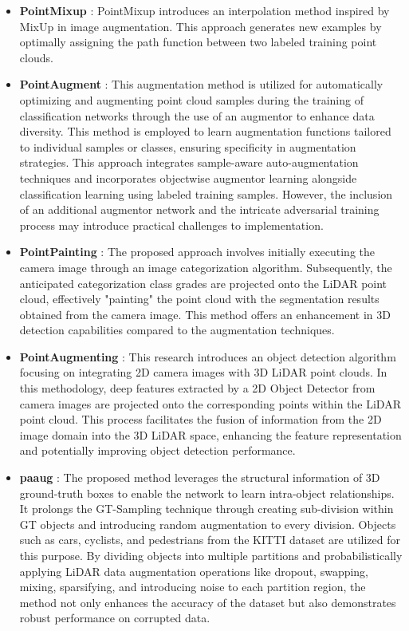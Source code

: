 \begin{itemize}
    \item \textbf{PointMixup} : PointMixup \parencite{pointmixup2020} introduces an interpolation method inspired by MixUp \parencite{mixup} in image augmentation. This approach generates new examples by optimally assigning the path function between two labeled training point clouds.
    \item \textbf{PointAugment} : This augmentation method \parencite{pointaugment2020}is utilized for automatically optimizing and augmenting point cloud samples during the training of classification networks through the use of an augmentor to enhance data diversity. This method is employed to learn augmentation functions tailored to individual samples or classes, ensuring specificity in augmentation strategies. This approach integrates sample-aware auto-augmentation techniques and incorporates objectwise augmentor learning alongside classification learning using labeled training samples. However, the inclusion of an additional augmentor network and the intricate adversarial training process may introduce practical challenges to implementation.
    \item \textbf{PointPainting} : The proposed approach \parencite{pointpainting2019} involves initially executing the camera image through an image categorization algorithm. Subsequently, the anticipated categorization class grades are projected onto the LiDAR point cloud, effectively "painting" the point cloud with the segmentation results obtained from the camera image. This method offers an enhancement in 3D detection capabilities compared to the augmentation techniques.
    \item \textbf{PointAugmenting} : This research \parencite{pointaugmenting2021} introduces an object detection algorithm focusing on integrating 2D camera images with 3D LiDAR point clouds. In this methodology, deep features extracted by a 2D Object Detector from camera images are projected onto the corresponding points within the LiDAR point cloud. This process facilitates the fusion of information from the 2D image domain into the 3D LiDAR space, enhancing the feature representation and potentially improving object detection performance.
    \item \textbf{\acrfull{paaug}} : The proposed method \parencite{pa_aug2020} leverages the structural information of 3D ground-truth boxes to enable the network to learn intra-object relationships. It prolongs the GT-Sampling technique through creating sub-division within GT objects and introducing random augmentation to every division. Objects such as cars, cyclists, and pedestrians from the KITTI dataset are utilized for this purpose. By dividing objects into multiple partitions and probabilistically applying LiDAR data augmentation operations like dropout, swapping, mixing, sparsifying, and introducing noise to each partition region, the method not only enhances the accuracy of the dataset but also demonstrates robust performance on corrupted data.

\end{itemize}
